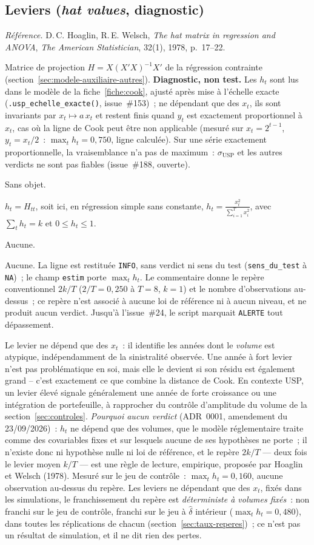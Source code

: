 \documentclass[a4paper,11pt]{article}
\newcommand{\code}[1]{\texttt{\small #1}}
\newcommand{\refl}[1]{{\small\textcolor{maincolor!70!black}{\textit{Référence.} #1}}\par\smallskip}
\newcounter{ficheid}
\newenvironment{fiche}[1]{%
  \stepcounter{ficheid}%
  \phantomsection
  \subsection{#1}%
  \label{fiche:\theficheid}%
}{%
  \end{description}\vspace{0.5em}%
}
\newcommand{\Cadre}{%
  \begin{description}[leftmargin=0pt, style=unboxed, itemsep=3pt, topsep=3pt, parsep=2pt]%
  \item[\textcolor{financeblue}{\textbf{1. Cadre, notations et hypothèses de validité (non testées).}}]}
\newcommand{\Hzero}{\item[\textcolor{financeblue}{\textbf{2. Hypothèse nulle.}}]}
\newcommand{\Stat}{\item[\textcolor{financeblue}{\textbf{3. Statistique de test.}}]}
\newcommand{\Loi}{\item[\textcolor{financeblue}{\textbf{4. Loi sous $H_0$.}}]}
\newcommand{\Pval}{\item[\textcolor{financeblue}{\textbf{5. p-value.}}]}
\newcommand{\Usage}{\item[\textcolor{financeblue}{\textbf{6. Usage et limites.}}]}
\begin{document}
\begin{fiche}{Leviers (\emph{hat values}, diagnostic)}
\label{fiche:leviers}%
\refl{D.\,C. Hoaglin, R.\,E. Welsch, \emph{The hat matrix in regression and ANOVA},
\emph{The American Statistician}, 32(1), 1978, p.~17--22.}
\Cadre
Matrice de projection $H = X(X'X)^{-1}X'$ de la régression contrainte (section~\ref{sec:modele-auxiliaire-autres}). \textbf{Diagnostic, non
test.} Les $h_t$ sont lus dans le modèle de la fiche~\ref{fiche:cook}, ajusté après mise à
l'échelle exacte (\code{.usp\_echelle\_exacte()}, issue~\#153)~; ne dépendant que des $x_t$,
ils sont invariants par $x_t \mapsto a\,x_t$ et restent finis quand $y_t$ est exactement
proportionnel à $x_t$, cas où la ligne de Cook peut être non applicable (mesuré sur $x_t = 2^{t-1}$,
$y_t = x_t/2$~: $\max_t h_t = 0{,}750$, ligne calculée). Sur une série exactement proportionnelle, la vraisemblance n'a pas de maximum~: $\sigma_{\mathrm{USP}}$ et les autres verdicts ne sont pas fiables (issue~\#188, ouverte).
\Hzero
Sans objet.
\Stat
$h_t = H_{tt}$, soit ici, en régression simple sans constante,
$\displaystyle h_t = \frac{x_t^2}{\sum_{i=1}^{T} x_i^2}$, avec $\sum_t h_t = k$ et
$0 \le h_t \le 1$.
\Loi
Aucune.
\Pval
Aucune. La ligne est restituée \code{INFO}, sans verdict ni sens du test
(\code{sens\_du\_test} à \code{NA})~; le champ \code{estim} porte $\max_t h_t$. Le commentaire donne
le repère conventionnel $2k/T$ ($2/T = 0{,}250$ à $T = 8$, $k = 1$) et le nombre d'observations
au-dessus~; ce repère n'est associé à aucune loi de référence ni à aucun niveau, et ne produit
aucun verdict. Jusqu'à l'issue~\#24, le script marquait \code{ALERTE} tout dépassement.
\Usage
Le levier ne dépend que des $x_t$~: il identifie les années dont le \emph{volume} est atypique,
indépendamment de la sinistralité observée. Une année à fort levier n'est pas problématique en
soi, mais elle le devient si son résidu est également grand -- c'est exactement ce que combine la
distance de Cook. En contexte USP, un levier élevé signale généralement une année de forte
croissance ou une intégration de portefeuille, à rapprocher du contrôle d'amplitude du volume de
la section~\ref{sec:controles}. \emph{Pourquoi aucun verdict} (ADR~0001, amendement du
23/09/2026)~: $h_t$ ne dépend que des volumes, que le modèle réglementaire traite comme des
covariables fixes et sur lesquels aucune de ses hypothèses ne porte~; il n'existe donc ni
hypothèse nulle ni loi de référence, et le repère $2k/T$ --- deux fois le levier moyen $k/T$ ---
est une règle de lecture, empirique, proposée par Hoaglin et Welsch (1978). Mesuré sur le jeu de
contrôle~: $\max_t h_t = 0{,}160$, aucune observation au-dessus du repère. Les leviers ne
dépendant que des $x_t$, fixés dans les simulations, le franchissement du repère est
\emph{déterministe à volumes fixés}~: non franchi sur le jeu de contrôle, franchi sur le jeu à
$\hat\delta$ intérieur ($\max_t h_t = 0{,}480$), dans toutes les réplications de chacun
(section~\ref{sec:taux-reperes})~; ce n'est pas un résultat de simulation, et il ne dit rien des
pertes.
\end{fiche}
\end{document}
